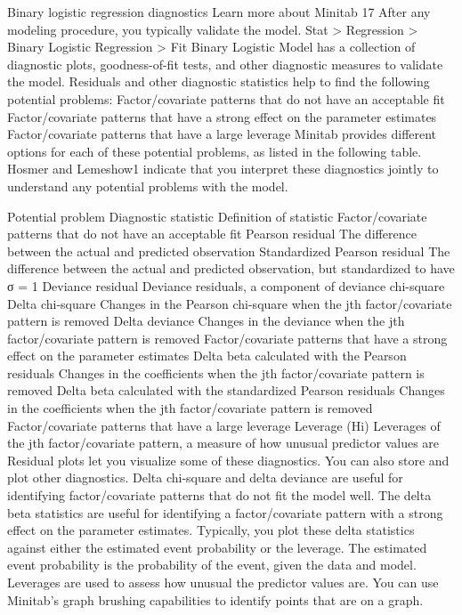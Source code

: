 Binary logistic regression diagnostics
Learn more about Minitab 17 
After any modeling procedure, you typically validate the model. Stat > Regression > Binary Logistic Regression > Fit Binary Logistic Model has a collection of diagnostic plots, goodness-of-fit tests, and other diagnostic measures to validate the model. Residuals and other diagnostic statistics help to find the following potential problems:
Factor/covariate patterns that do not have an acceptable fit
Factor/covariate patterns that have a strong effect on the parameter estimates
Factor/covariate patterns that have a large leverage
Minitab provides different options for each of these potential problems, as listed in the following table. Hosmer and Lemeshow1 indicate that you interpret these diagnostics jointly to understand any potential problems with the model.

Potential problem	Diagnostic statistic	Definition of statistic
Factor/covariate patterns that do not have an acceptable fit	Pearson residual	The difference between the actual and predicted observation
Standardized Pearson residual	The difference between the actual and predicted observation, but standardized to have σ = 1
Deviance residual	Deviance residuals, a component of deviance chi-square
Delta chi-square	Changes in the Pearson chi-square when the jth factor/covariate pattern is removed
Delta deviance	Changes in the deviance when the jth factor/covariate pattern is removed
Factor/covariate patterns that have a strong effect on the parameter estimates	Delta beta calculated with the Pearson residuals	Changes in the coefficients when the jth factor/covariate pattern is removed
Delta beta calculated with the standardized Pearson residuals	Changes in the coefficients when the jth factor/covariate pattern is removed
Factor/covariate patterns that have a large leverage	Leverage (Hi)	Leverages of the jth factor/covariate pattern, a measure of how unusual predictor values are
Residual plots let you visualize some of these diagnostics. You can also store and plot other diagnostics. Delta chi-square and delta deviance are useful for identifying factor/covariate patterns that do not fit the model well. The delta beta statistics are useful for identifying a factor/covariate pattern with a strong effect on the parameter estimates. Typically, you plot these delta statistics against either the estimated event probability or the leverage. The estimated event probability is the probability of the event, given the data and model. Leverages are used to assess how unusual the predictor values are. You can use Minitab's graph brushing capabilities to identify points that are on a graph.
